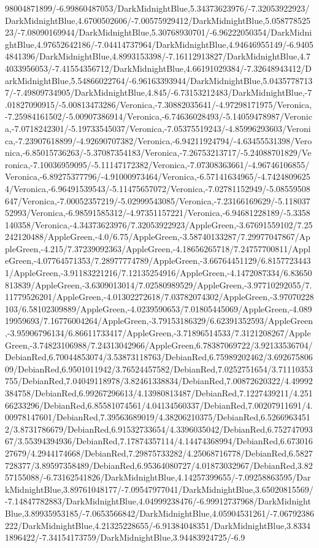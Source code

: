 {\begin{tikzternal}
98004871899/-6.99860487053/DarkMidnightBlue,5.34373623976/-7.32053922923/DarkMidnightBlue,4.6700502606/-7.00575929412/DarkMidnightBlue,5.05877852523/-7.08090169944/DarkMidnightBlue,5.30768930701/-6.96222050354/DarkMidnightBlue,4.97652642186/-7.04414737964/DarkMidnightBlue,4.94646955149/-6.94054841396/DarkMidnightBlue,4.8993153398/-7.16112913827/DarkMidnightBlue,4.74033956053/-7.41554356712/DarkMidnightBlue,4.66191029384/-7.32648943412/DarkMidnightBlue,5.54866022764/-6.96163393944/DarkMidnightBlue,5.04357787137/-7.49809734905/DarkMidnightBlue,4.845/-6.73153212483/DarkMidnightBlue,-7.01827090915/-5.00813473286/Veronica,-7.30882035641/-4.97298171975/Veronica,-7.25984161502/-5.00907386914/Veronica,-6.74636028493/-5.14059478987/Veronica,-7.0718242301/-5.19733545037/Veronica,-7.05375519243/-4.85996293603/Veronica,-7.23907618899/-4.92690707382/Veronica,-6.94211924794/-4.63455531398/Veronica,-6.85015736263/-5.37087354183/Veronica,-7.26753213717/-5.24088701829/Veronica,-7.10036959095/-5.11147172382/Veronica,-7.07308363661/-4.96746106855/Veronica,-6.89275377796/-4.91000973464/Veronica,-6.57141634965/-4.74248096254/Veronica,-6.96491539543/-5.11475657072/Veronica,-7.02781152949/-5.08559508647/Veronica,-7.00052357219/-5.02999543085/Veronica,-7.23166169629/-5.11803752993/Veronica,-6.98591585312/-4.97351157221/Veronica,-6.94681228189/-5.3358140358/Veronica,-4.34373623976/7.32053922923/AppleGreen,-3.67691559102/7.25242120488/AppleGreen,-4.0/6.75/AppleGreen,-3.58740133287/7.29977047867/AppleGreen,-4.215/7.37239092363/AppleGreen,-4.18656265718/7.24757700811/AppleGreen,-4.07764571353/7.28977774789/AppleGreen,-3.66764451129/6.81577234431/AppleGreen,-3.91183221216/7.12135254916/AppleGreen,-4.1472087334/6.83650813839/AppleGreen,-3.6309013014/7.02580989529/AppleGreen,-3.97710292055/7.11779526201/AppleGreen,-4.01302272618/7.03782074302/AppleGreen,-3.97070228103/6.58102309889/AppleGreen,-4.0239590653/7.01805445069/AppleGreen,-4.08919959693/7.16776004264/AppleGreen,-3.79153186329/6.62391352593/AppleGreen,-3.95906796134/6.86611733417/AppleGreen,-3.71896514533/7.3121208267/AppleGreen,-3.74823106988/7.24313042966/AppleGreen,6.78387069722/3.92133536704/DebianRed,6.70044853074/3.53873118763/DebianRed,6.75989202462/3.69267580609/DebianRed,6.9501011942/3.76524457582/DebianRed,7.0252751654/3.71110353755/DebianRed,7.04049118978/3.82461338834/DebianRed,7.00872620322/4.49992384758/DebianRed,6.99267296613/4.13980813487/DebianRed,7.1227439211/4.25166233296/DebianRed,6.85581074561/4.04134560337/DebianRed,7.00207911691/4.00978147601/DebianRed,7.39563689019/4.38206210375/DebianRed,6.52669634512/3.8731786679/DebianRed,6.91532733654/4.3396035042/DebianRed,6.75274709367/3.55394394936/DebianRed,7.17874357114/4.14474368994/DebianRed,6.67301627679/4.2944174668/DebianRed,7.29875733282/4.25068716778/DebianRed,6.5827728377/3.89597358489/DebianRed,6.95364080727/4.01873032967/DebianRed,3.8257155088/-6.73162541826/DarkMidnightBlue,4.14257399655/-7.09258863595/DarkMidnightBlue,3.89761048177/-7.09547977041/DarkMidnightBlue,3.65020815569/-7.14847782883/DarkMidnightBlue,4.04999238476/-6.99912737968/DarkMidnightBlue,3.89935953185/-7.0653566842/DarkMidnightBlue,4.05904531261/-7.06792386222/DarkMidnightBlue,4.21325228655/-6.91384048351/DarkMidnightBlue,3.83341896422/-7.34154173759/DarkMidnightBlue,3.94483924725/-6.9
\end{tikzternal}}
